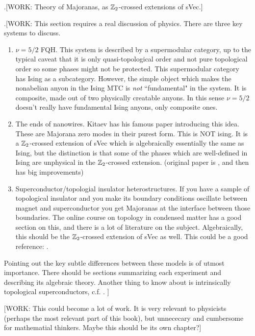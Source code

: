 .[WORK: Theory of Majoranas, as $\mathbb{Z}_2$-crossed extensions of sVec.]

.[WORK: This section requires a real discussion of physics. There are three key systems to discuss.

\begin{enumerate}
\item $\nu=5/2$ FQH. This system is described by a supermodular category, up to the typical caveat that it is only quasi-topological order and not pure topological order so some phases might not be protected. This supermodular category has Ising as a subcategory. However, the simple object which makes the nonabelian anyon in the Ising MTC is \textit{not} ``fundamental" in the system. It is composite, made out of two physically creatable anyons. In this sense $\nu =5/2$ doesn't really have fundamental Ising anyons, only composite ones.

\item The ends of nanowires. Kitaev has his famous paper introducing this idea. These are Majorana zero modes in their purest form. This is NOT ising. It is a $\mathbb{Z}_2$-crossed extension of sVec which is algebraically essentially the same as Ising, but the distinction is that some of the phases which are well-defined in Ising are unphysical in the $\mathbb{Z}_2$-crossed extension. (original paper is \cite{kitaev2001unpaired}, and then \cite{fidkowski2011topological} has big improvements)

\item Superconductor/topologial insulator heterostructures. If you have a sample of topological insulator and you make its boundary conditions oscillate between magnet and superconductor you get Majoranas at the interface between those boundaries. The online course on topology in condensed matter has a good section on this, and there is a lot of literature on the subject. Algebraically, this should be the $\mathbb{Z}_2$-crossed extension of sVec as well. This could be a good reference: \cite{son2019commuting}.
\end{enumerate}

Pointing out the key subtle differences between these models is of utmost importance. There should be sections summarizing each experiment and describing its algebraic theory. Another thing to know about is intrinsically topological superconductors, c.f. \cite{bonderson2013time}.
]

[WORK: This could become a lot of work. It is very relevant to physicists (perhaps the most relevant part of this book), but unnececary and cumbersome for mathematial thinkers. Maybe this should be its own chapter?]

